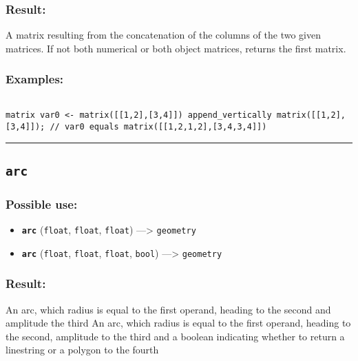 \documentclass[]{book}
\providecommand{\tightlist}{%
  \setlength{\itemsep}{0pt}\setlength{\parskip}{0pt}}
\theoremstyle{definition}
\theoremstyle{definition}
\theoremstyle{definition}
\theoremstyle{remark}
\begin{document}
\subsubsection{Result:}\label{result-39}

A matrix resulting from the concatenation of the columns of the two
given matrices. If not both numerical or both object matrices, returns
the first matrix.

\subsubsection{Examples:}\label{examples-32}

\begin{verbatim}
 
matrix var0 <- matrix([[1,2],[3,4]]) append_vertically matrix([[1,2],[3,4]]); // var0 equals matrix([[1,2,1,2],[3,4,3,4]])
\end{verbatim}

\begin{center}\rule{0.5\linewidth}{\linethickness}\end{center}

\subsection{\texorpdfstring{\texttt{arc}}{arc}}\label{arc}

\subsubsection{Possible use:}\label{possible-use-41}

\begin{itemize}
\tightlist
\item
  \textbf{\texttt{arc}} (\texttt{float}, \texttt{float}, \texttt{float})
  ---\textgreater{} \texttt{geometry}
\item
  \textbf{\texttt{arc}} (\texttt{float}, \texttt{float}, \texttt{float},
  \texttt{bool}) ---\textgreater{} \texttt{geometry}
\end{itemize}

\subsubsection{Result:}\label{result-40}

An arc, which radius is equal to the first operand, heading to the
second and amplitude the third An arc, which radius is equal to the
first operand, heading to the second, amplitude to the third and a
boolean indicating whether to return a linestring or a polygon to the
fourth
\end{document}
